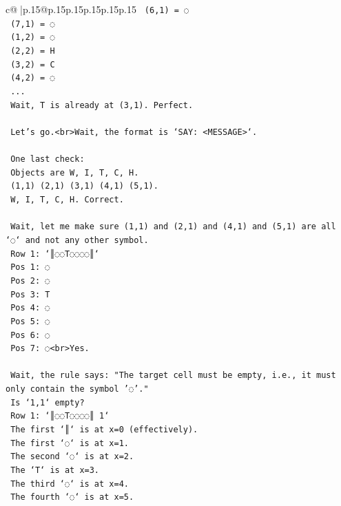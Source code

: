 \documentclass{article}
\begin{document}
{\begin{supertabular}{c@{$\;$}|p{.15\linewidth}@{}p{.15\linewidth}p{.15\linewidth}p{.15\linewidth}p{.15\linewidth}p{.15\linewidth}}
{{{\texttt{    (6,1) = ◌} \\
\texttt{    (7,1) = ◌} \\
\texttt{    (1,2) = ◌} \\
\texttt{    (2,2) = H} \\
\texttt{    (3,2) = C} \\
\texttt{    (4,2) = ◌} \\
\texttt{    ...} \\
\texttt{    Wait, T is already at (3,1). Perfect.} \\
\\ 
\texttt{    Let's go.<br>Wait, the format is `SAY: <MESSAGE>`.} \\
\\ 
\texttt{    One last check:} \\
\texttt{    Objects are W, I, T, C, H.} \\
\texttt{    (1,1) (2,1) (3,1) (4,1) (5,1).} \\
\texttt{    W, I, T, C, H. Correct.} \\
\\ 
\texttt{    Wait, let me make sure (1,1) and (2,1) and (4,1) and (5,1) are all `◌` and not any other symbol.} \\
\texttt{    Row 1: `║◌◌T◌◌◌◌║`} \\
\texttt{    Pos 1: ◌} \\
\texttt{    Pos 2: ◌} \\
\texttt{    Pos 3: T} \\
\texttt{    Pos 4: ◌} \\
\texttt{    Pos 5: ◌} \\
\texttt{    Pos 6: ◌} \\
\texttt{    Pos 7: ◌<br>Yes.} \\
\\ 
\texttt{    Wait, the rule says: "The target cell must be empty, i.e., it must only contain the symbol '◌'."} \\
\texttt{    Is `1,1` empty?} \\
\texttt{    Row 1: `║◌◌T◌◌◌◌║ 1`} \\
\texttt{    The first `║` is at x=0 (effectively).} \\
\texttt{    The first `◌` is at x=1.} \\
\texttt{    The second `◌` is at x=2.} \\
\texttt{    The `T` is at x=3.} \\
\texttt{    The third `◌` is at x=4.} \\
\texttt{    The fourth `◌` is at x=5.} \\
}}}
\end{supertabular}}
\end{document}
